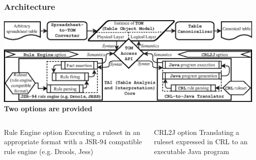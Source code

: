 \documentclass[10pt]{beamer}
\begin{document}


\begin{frame}
\frametitle{Architecture}
\includegraphics[width=1.0\linewidth]{architecture}
\hspace*{\fill} \textbf{Two options are provided} \hspace*{\fill}
\begin{columns}
\begin{block}{\small Rule Engine option}
\small Executing a ruleset in an appropriate format with a JSR-94 compatible rule engine (e.g. Drools, Jess)
\end{block}
\begin{block}{\small CRL2J option}
\small Translating a ruleset expressed in CRL to an executable Java program
\end{block}
\end{columns}
\end{frame}



\end{document}
